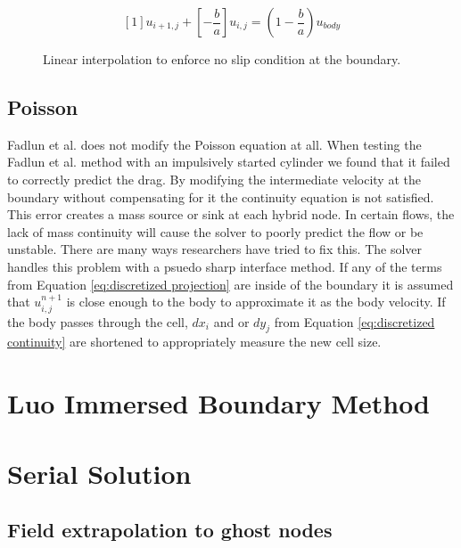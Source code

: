 \documentclass[onehalf,11pt]{beavtex}
\begin{document}
\begin{equation}
\left[1\right]u_{i+1,j} + \left[-\frac{b}{a}\right]u_{i,j} = \left(1-\frac{b}{a}\right)u_{body}
\label{eq:ID intermediate velocity interpolation}
\end{equation}

\begin{figure}[htb]
	\centering
	
	\caption{Linear interpolation to enforce no slip condition at the boundary.}
	\label{fig:ID linear interpolation}
\end{figure}

\subsection{Poisson}
Fadlun et al. does not modify the Poisson equation at all.
When testing the Fadlun et al. method with an impulsively started cylinder we found that it failed to correctly predict the drag.
By modifying the intermediate velocity at the boundary without compensating for it the continuity equation is not satisfied.
This error creates a mass source or sink at each hybrid node. 
In certain flows, the lack of mass continuity will cause the solver to poorly predict the flow or be unstable.
There are many ways researchers have tried to fix this.
The solver handles this problem with a psuedo sharp interface method. 
If any of the terms from Equation \eqref{eq:discretized projection} are inside of the boundary it is assumed that $u_{i,j}^{n+1}$ is close enough to the body to approximate it as the body velocity.
If the body passes through the cell, $dx_i$ and or $dy_j$ from Equation \eqref{eq:discretized continuity} are shortened to appropriately measure the new cell size.

\section{Luo Immersed Boundary Method}
\section{Serial Solution}\label{ID:Serial}
\subsection{Field extrapolation to ghost nodes}
\end{document}
